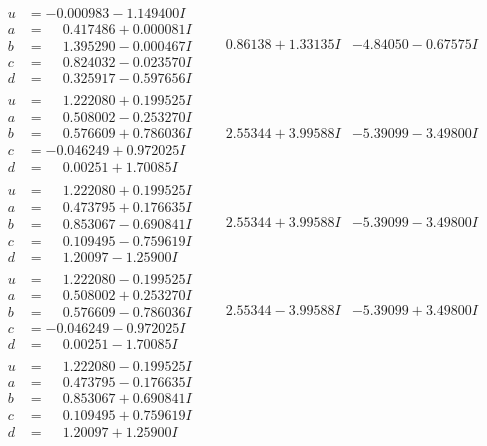 \documentclass[1p]{elsarticle_modified}
\theoremstyle{definition}
\begin{document}
$$\begin{array}{c|c|c}
\begin{aligned}
u &= -0.000983 - 1.149400 I \\
a &= \phantom{-}0.417486 + 0.000081 I \\
b &= \phantom{-}1.395290 - 0.000467 I \\
c &= \phantom{-}0.824032 - 0.023570 I \\
d &= \phantom{-}0.325917 - 0.597656 I\end{aligned}
 & \phantom{-}0.86138 + 1.33135 I & -4.84050 - 0.67575 I \\ \hline\begin{aligned}
u &= \phantom{-}1.222080 + 0.199525 I \\
a &= \phantom{-}0.508002 - 0.253270 I \\
b &= \phantom{-}0.576609 + 0.786036 I \\
c &= -0.046249 + 0.972025 I \\
d &= \phantom{-}0.00251 + 1.70085 I\end{aligned}
 & \phantom{-}2.55344 + 3.99588 I & -5.39099 - 3.49800 I \\ \hline\begin{aligned}
u &= \phantom{-}1.222080 + 0.199525 I \\
a &= \phantom{-}0.473795 + 0.176635 I \\
b &= \phantom{-}0.853067 - 0.690841 I \\
c &= \phantom{-}0.109495 - 0.759619 I \\
d &= \phantom{-}1.20097 - 1.25900 I\end{aligned}
 & \phantom{-}2.55344 + 3.99588 I & -5.39099 - 3.49800 I \\ \hline\begin{aligned}
u &= \phantom{-}1.222080 - 0.199525 I \\
a &= \phantom{-}0.508002 + 0.253270 I \\
b &= \phantom{-}0.576609 - 0.786036 I \\
c &= -0.046249 - 0.972025 I \\
d &= \phantom{-}0.00251 - 1.70085 I\end{aligned}
 & \phantom{-}2.55344 - 3.99588 I & -5.39099 + 3.49800 I \\ \hline\begin{aligned}
u &= \phantom{-}1.222080 - 0.199525 I \\
a &= \phantom{-}0.473795 - 0.176635 I \\
b &= \phantom{-}0.853067 + 0.690841 I \\
c &= \phantom{-}0.109495 + 0.759619 I \\
d &= \phantom{-}1.20097 + 1.25900 I\end{aligned}

\end{array}$$
\end{document}
